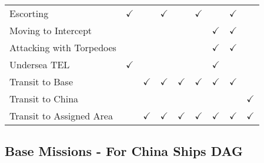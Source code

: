 \documentclass{article}
\begin{document}
\begin{center}
\begin{adjustbox}{max width=\textwidth,center}
\begin{tabular}{lcccccccc}
\rowcolor{gray!10}
Escorting  & $\checkmark$            &             & $\checkmark$ &      & $\checkmark$             &         &  $\checkmark$     &     \\
\rowcolor{gray!5}
Moving to Intercept     &            &            &  &         &            & $\checkmark$         & $\checkmark$     &     \\
\rowcolor{gray!10}
Attacking with Torpedoes &            &            &  &         &            & $\checkmark$         & $\checkmark$     &     \\
\rowcolor{gray!5}
Undersea TEL            & $\checkmark$            &            &  &         &            & $\checkmark$         &       &     \\
\rowcolor{gray!10}
Transit to Base         &            & $\checkmark$            & $\checkmark$  & $\checkmark$         & $\checkmark$             & $\checkmark$         & $\checkmark$     &     \\
\rowcolor{gray!5}
Transit to China        &            &            &  &         &            &         &       & $\checkmark$      \\
\rowcolor{gray!10}
Transit to Assigned Area         &            & $\checkmark$            & $\checkmark$  & $\checkmark$         & $\checkmark$             & $\checkmark$         &  $\checkmark$   &  $\checkmark$   \\
\bottomrule
\end{tabular}
\end{adjustbox}
\end{center}

\subsection{Base Missions - For China Ships DAG}
\end{document}
